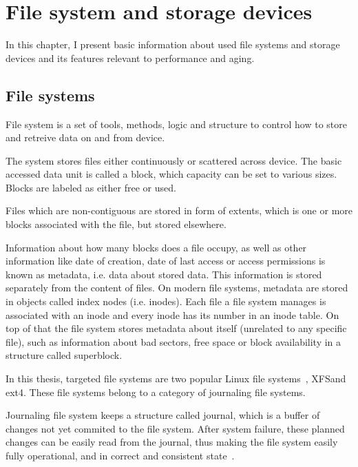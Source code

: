 \documentclass[
  color, %
  table, %
  lof,   %
  lot,   %
]{fithesis3}
\begin{document}

\chapter{File system and storage devices}
\label{fs}
In this chapter, I present basic information about used file systems and storage devices and its features relevant to performance and aging.

\section{File systems}
File system is a set of tools, methods, logic and structure to control how to store and retreive data on and from device.

The system stores files either continuously or scattered across device. The basic accessed data unit is called a block, which capacity can be set to various sizes. Blocks are labeled as either free or used.

Files which are non-contiguous are stored in form of extents, which is one or more blocks associated with the file, but stored elsewhere.  

Information about how many blocks does a file occupy, as well as other information like date of creation, date of last access or access permissions is known as metadata, i.e. data about stored data. This information is stored separately from the content of files. On modern file systems, metadata are stored in objects called index nodes (i.e. inodes). Each file a file system manages is associated with an inode and every inode has its number in an inode table. On top of that the file system stores metadata about itself (unrelated to any specific file), such as information about bad sectors, free space or block availability in a structure called superblock.

In this thesis, targeted file systems are two popular Linux file systems~\cite{Lu:2013:SLF:2591272.2591276}, XFS\footnotemark[1] and ext4\footnotemark[2]. These file systems belong to a category of journaling file systems.

Journaling file system keeps a structure called journal, which is a buffer of changes not yet commited to the file system. After system failure, these planned changes can be easily read from the journal, thus making the file system easily fully operational, and in correct and consistent state~\cite{prabhakaran2005analysis}.
\end{document}
